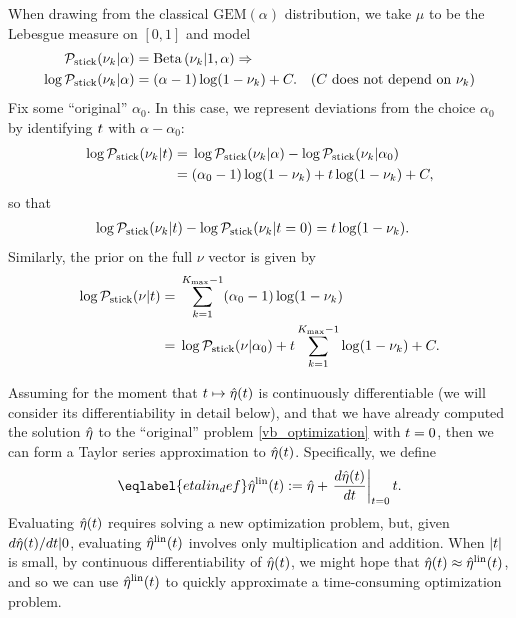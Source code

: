 \begin{ex}
%
When drawing from the classical $\mathrm{GEM}(\alpha)$ distribution, we take
$\mu$ to be the Lebesgue measure on $[0,1]$ and model
%
\begin{align*}
%
\pstick(\nuk \vert \alpha) ={}&
    \betadist{\nuk \vert 1, \alpha} \Rightarrow\\
\log \pstick(\nuk \vert \alpha) ={}&
    (\alpha - 1) \log(1 - \nuk) + \const. &
    \constdesc{\nuk}
%
\end{align*}
%
Fix some ``original'' $\alpha_0$.  In this case, we represent deviations from
the choice $\alpha_0$ by identifying $t$ with $\alpha - \alpha_0$:
%
\begin{align*}
%
\log \pstick(\nuk \vert \t) ={}&
    \log \pstick(\nuk \vert \alpha) - \log \pstick(\nuk \vert \alpha_0)\\
%
%
 ={}&
    (\alpha_0 - 1) \log(1 - \nuk) +
    \t \log(1 - \nuk) + \const,
\end{align*}
%
so that
%
\begin{align*}
%
\log \pstick(\nuk \vert \t) - \log \pstick(\nuk \vert \t=0) ={}&
    \t \log(1 - \nuk).
%
\end{align*}
%
Similarly, the prior on the full $\nu$ vector is given by
%
\begin{align*}
%
\log \pstick(\nu \vert \t) ={}&
    \sumkm (\alpha_0 - 1) \log(1 - \nuk)
\\={}&
    \log \pstick(\nu \vert \alpha_0) + \t \sumkm \log(1 - \nuk) + \const.
%
\end{align*}
%
\end{ex}

Assuming for the moment that $t \mapsto \hat\eta(t)$ is continuously
differentiable (we will consider its differentiability in detail below), and
that we have already computed the solution $\hat\eta$ to the ``original'' problem
\eqref{vb_optimization} with $t=0$, then we can form a Taylor series
approximation to $\hat\eta(t)$.  Specifically, we define
%
\begin{align}\eqlabel{etalin_def}
%
\etalin(\t) := \etaopt + \fracat{d \etaopt(\t)}{d \t}{\t=0} \t .
%
\end{align}
%
Evaluating $\hat\eta(t)$ requires solving a new optimization problem, but, given
$d\hat\eta(t) / dt | 0$, evaluating $\hat\eta^{\mathrm{lin}}(t)$ involves only
multiplication and addition.  When $|t|$ is small, by continuous
differentiability of $\hat\eta(t)$, we might hope that $\hat\eta(t) \approx
\hat\eta^{\mathrm{lin}}(t)$, and so we can use $\hat\eta^{\mathrm{lin}}(t)$ to quickly approximate a
time-consuming optimization problem.

